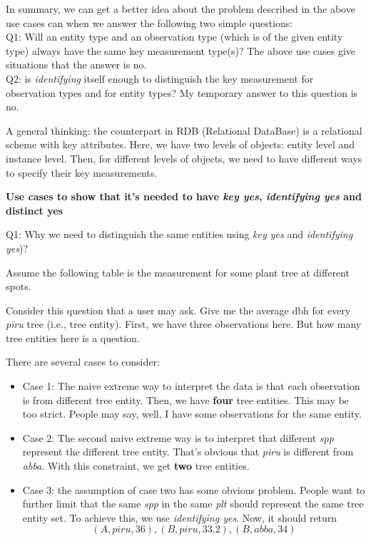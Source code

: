 \documentclass[10pt]{article}
\begin{document}
In summary, we can get a better idea about the problem described in the above use cases can when we answer the following two simple questions: \\
Q1:  Will an entity type and an observation type (which is of the given entity type) always have the same key measurement type(s)?
     The above use cases give situations that the answer is no.  \\
Q2: is {\em identifying} itself enough to distinguish the key measurement for observation types and for entity types? 
    My temporary answer to this question is no. 

A general thinking: 
the counterpart in RDB (Relational DataBase) is a relational scheme with key attributes. 
Here, we have two levels of objects: entity level and instance level.
Then, for different levels of objects, we need to have different ways to specify their key measurements. 

\newpage

{\bf Use cases to show that it's needed to have {\em key yes}, {\em identifying yes} and {distinct yes}}

Q1: Why we need to distinguish the same entities using {\em key yes} and {\em identifying yes})? 

Assume the following table is the measurement for some plant tree at different spots. 

Consider this question that a user may ask. Give me the average dbh for every {\em piru} tree (i.e., tree entity). 
First, we have three observations here.
But how many tree entities here is a question. 

There are several cases to consider:
\begin{itemize}
\item Case 1: The naive extreme way to interpret the data is that each observation is from different tree entity. Then, we have {\bf four} tree entities. 
	This may be too strict. People may say, well, I have some observations for the same entity. 
\item Case 2: The second naive extreme way is to interpret that different {\em spp} represent the different tree entity. 
That's obvious that {\em piru} is different from {\em abba}. 
With this constraint, we get {\bf two} tree entities. 
\item Case 3: the assumption of case two has some obvious problem. 
People want to further limit that the same {\em spp} in the same {\em plt} should represent the same tree entity set. 
To achieve this, we use {\em identifying yes}.
   Now, it should return
	\[(A, piru, 36), (B, piru, 33.2), (B, abba, 34)\]
\end{itemize}
\end{document}
